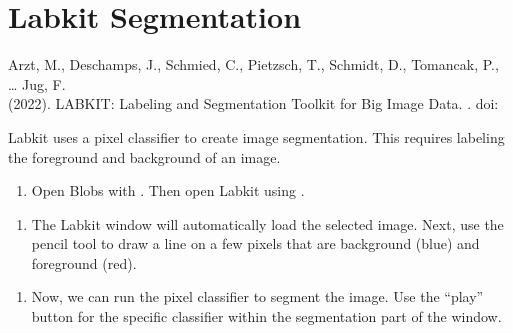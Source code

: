 \documentclass[letterpaper,10pt,english]{jupyterBook}
\begin{document}
\sphinxAtStartPar
{}

\sphinxstepscope


\chapter{Labkit Segmentation}
\label{\detokenize{labkit:labkit-segmentation}}\label{\detokenize{labkit::doc}}
\sphinxAtStartPar
{}

\sphinxAtStartPar
Arzt, M., Deschamps, J., Schmied, C., Pietzsch, T., Schmidt, D., Tomancak, P., … Jug, F.\\
(2022). LABKIT: Labeling and Segmentation Toolkit for Big Image Data. . doi:

\sphinxAtStartPar
Labkit uses a pixel classifier to create image segmentation. This requires labeling the foreground and background of an image.
\begin{enumerate}
%
\item {} 
\sphinxAtStartPar
Open Blobs with . Then open Labkit using .

\end{enumerate}

\sphinxAtStartPar
{}
\begin{enumerate}
%
\setcounter{enumi}{1}
\item {} 
\sphinxAtStartPar
The Labkit window will automatically load the selected image. Next, use the pencil tool to draw a line on a few pixels that are background (blue) and foreground (red).

\end{enumerate}

\sphinxAtStartPar
{}
\begin{enumerate}
%
\setcounter{enumi}{2}
\item {} 
\sphinxAtStartPar
Now, we can run the pixel classifier to segment the image. Use the “play” button for the specific classifier within the segmentation part of the window.

\end{enumerate}
\end{document}

